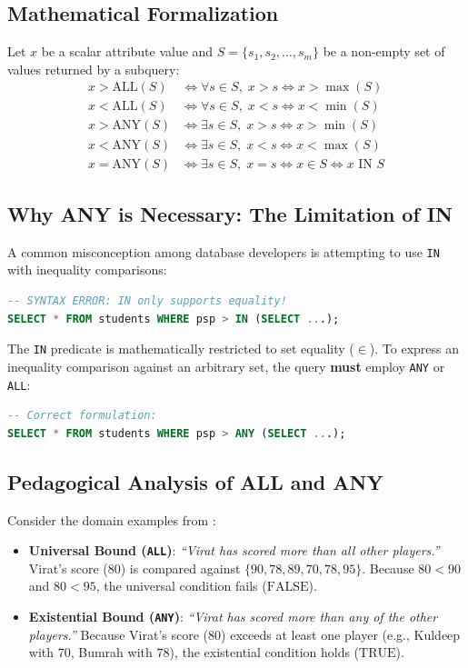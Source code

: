 \documentclass[10pt,twocolumn,letterpaper]{article}
\begin{document}
\subsection{Mathematical Formalization}
Let $x$ be a scalar attribute value and $S = \{s_1, s_2, \dots, s_m\}$ be a non-empty set of values returned by a subquery:
\begin{align}
x > \text{ALL}(S) &\iff \forall s \in S, \; x > s \iff x > \max(S) \\
x < \text{ALL}(S) &\iff \forall s \in S, \; x < s \iff x < \min(S) \\
x > \text{ANY}(S) &\iff \exists s \in S, \; x > s \iff x > \min(S) \\
x < \text{ANY}(S) &\iff \exists s \in S, \; x < s \iff x < \max(S) \\
x = \text{ANY}(S) &\iff \exists s \in S, \; x = s \iff x \in S \iff x \text{ IN } S
\end{align}

\subsection{Why ANY is Necessary: The Limitation of IN}
A common misconception among database developers is attempting to use \texttt{IN} with inequality comparisons:
\begin{lstlisting}[language=SQL]
-- SYNTAX ERROR: IN only supports equality!
SELECT * FROM students WHERE psp > IN (SELECT ...);
\end{lstlisting}
The \texttt{IN} predicate is mathematically restricted to set equality ($\in$). To express an inequality comparison against an arbitrary set, the query \textbf{must} employ \texttt{ANY} or \texttt{ALL}:
\begin{lstlisting}[language=SQL]
-- Correct formulation:
SELECT * FROM students WHERE psp > ANY (SELECT ...);
\end{lstlisting}

\subsection{Pedagogical Analysis of ALL and ANY}
Consider the domain examples from \cite{sql6notes}:
\begin{itemize}
    \item \textbf{Universal Bound (\texttt{ALL})}: \textit{``Virat has scored more than all other players.''}
    Virat's score ($80$) is compared against $\{90, 78, 89, 70, 78, 95\}$. Because $80 < 90$ and $80 < 95$, the universal condition fails ($\text{FALSE}$).
    \item \textbf{Existential Bound (\texttt{ANY})}: \textit{``Virat has scored more than any of the other players.''}
    Because Virat's score ($80$) exceeds at least one player (e.g., Kuldeep with $70$, Bumrah with $78$), the existential condition holds ($\text{TRUE}$).
\end{itemize}
\end{document}

